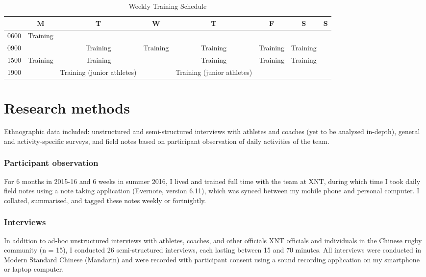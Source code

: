 \begin{table}[htpb]\caption{Weekly Training Schedule}
  \begin{center}
    \begin{small}
        \begin{tabular}{| c | c | c | c | c | c | c | c |}
          \hline
          & \bf M & \bf T & \bf W & \bf T & \bf F & \bf S & \bf S \\
          \hline
          0600 & Training &  &  & & & & \\
          \hline
          0900 &  & Training & Training & Training & Training & Training &  \\
            \hline
          1500 & Training & Training & & Training & Training & Training &  \\
            \hline
          1900 &  & Training (junior athletes) & & Training (junior athletes) & & & \\
             \hline
        \end{tabular}
      \end{small}
    \end{center}
  \end{table}


\section{Research methods}
Ethnographic data included: unstructured and semi-structured interviews with athletes and coaches (yet to be analysed in-depth), general and activity-specific surveys, and field notes based on participant observation of daily activities of the team.


\subsubsection{Participant observation}
For 6 months in 2015-16 and 6 weeks in summer 2016, I lived and trained full time with the team at XNT, during which time I took daily field notes using a note taking application (Evernote, version 6.11), which was synced between my mobile phone and personal computer. I collated, summarised, and tagged these notes weekly or fortnightly.

\subsubsection{Interviews}
In addition to ad-hoc unstructured interviews with athletes, coaches, and other officials XNT officials and individuals in the Chinese rugby community (n = 15), I conducted 26 semi-structured interviews, each lasting between 15 and 70 minutes.  All interviews were conducted in Modern Standard Chinese (Mandarin) and were recorded with participant consent using a sound recording application on my smartphone or laptop computer.

